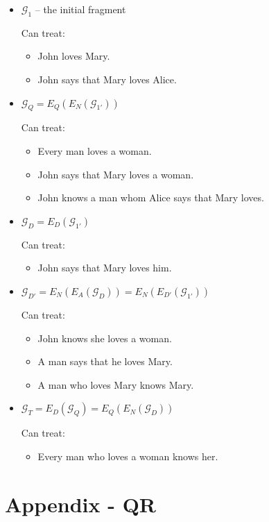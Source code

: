 \documentclass{article}
\begin{document}
\begin{itemize}
\item $\mathcal{G}_1$ -- the initial fragment

  Can treat:
  \begin{itemize}
  \item John loves Mary.
  \item John says that Mary loves Alice.
  \end{itemize}

\item $\mathcal{G}_Q = E_Q(E_N(\mathcal{G}_{1'}))$

  Can treat:
  \begin{itemize}
  \item Every man loves a woman.
  \item John says that Mary loves a woman.
  \item John knows a man whom Alice says that Mary loves.
  \end{itemize}
  
\item $\mathcal{G}_D = E_D(\mathcal{G}_{1'})$

  Can treat:
  \begin{itemize}
  \item John says that Mary loves him.
  \end{itemize}

\item $\mathcal{G}_{D'} = E_N(E_A(\mathcal{G}_D)) = E_N(E_{D'}(\mathcal{G}_{1'}))$

  Can treat:
  \begin{itemize}
  \item John knows she loves a woman.
  \item A man says that he loves Mary.
  \item A man who loves Mary knows Mary.
  \end{itemize}

\item $\mathcal{G}_T = E_D(\mathcal{G}_Q) = E_Q(E_N(\mathcal{G}_D))$

  Can treat:
  \begin{itemize}
  \item Every man who loves a woman knows her.
  \end{itemize}
\end{itemize}


\section*{Appendix - QR}
\end{document}
